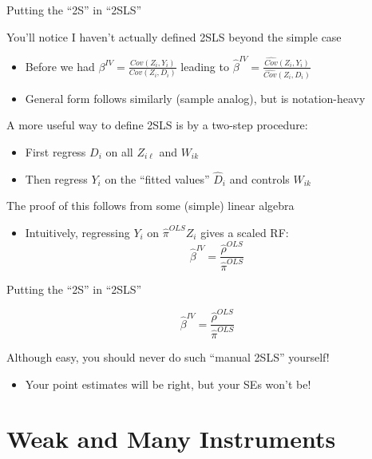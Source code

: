 \documentclass{beamer}
\begin{document}
\begin{frame}{Putting the ``2S'' in ``2SLS''}

You'll notice I haven't actually defined 2SLS beyond the simple case
\begin{itemize}
  \item Before we had $\beta^{IV}=\frac{Cov(Z_i,Y_i)}{Cov(Z_i,D_i)}$ leading to $\widehat\beta^{IV}=\frac{\widehat{Cov}(Z_i,Y_i)}{\widehat{Cov}(Z_i,D_i)}$ 
  \item General form follows similarly (sample analog), but is notation-heavy
\end{itemize}
\pause

A more useful way to define 2SLS is by a two-step procedure:
\begin{itemize}
  \item First regress $D_i$ on all $Z_{i\ell}$ and $W_{ik}$
  \item Then regress $Y_i$ on the ``fitted values'' $\widehat{D}_i$ and controls $W_{ik}$ 
\end{itemize}
\pause

The proof of this follows from some (simple) linear algebra 
\begin{itemize}
  \item Intuitively, regressing $Y_i$ on $\widehat{\pi}^{OLS}Z_i$ gives a scaled RF: 
  $$\widehat\beta^{IV}=\frac{\widehat{\rho}^{OLS}}{\widehat{\pi}^{OLS}}$$
\end{itemize}
\end{frame}

\begin{frame}{Putting the ``2S'' in ``2SLS''}

$$\widehat\beta^{IV}=\frac{\widehat{\rho}^{OLS}}{\widehat{\pi}^{OLS}}$$

\medskip
Although easy, you should never do such ``manual 2SLS'' yourself!
\begin{itemize}
\item Your point estimates will be right, but your SEs won't be!
\end{itemize}
\end{frame}

\section{Weak and Many Instruments}
\end{document}
